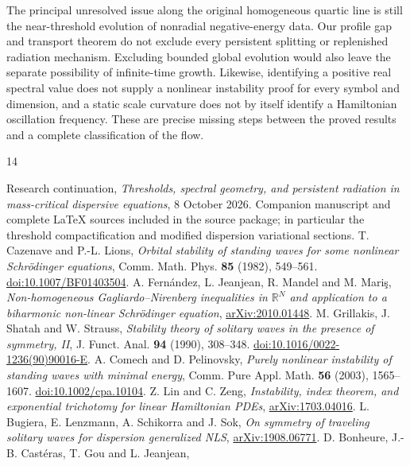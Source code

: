\documentclass[11pt,a4paper]{article}
\theoremstyle{remark}\newtheorem{remark}[theorem]{Remark}
\begin{document}
The principal unresolved issue along the original homogeneous quartic
line is still the near-threshold evolution of nonradial negative-energy
data. Our profile gap and transport theorem do not exclude every
persistent splitting or replenished radiation mechanism. Excluding
bounded global evolution would also leave the separate possibility of
infinite-time growth. Likewise, identifying a positive real spectral
value does not supply a nonlinear instability proof for every symbol
and dimension, and a static scale curvature does not by itself identify
a Hamiltonian oscillation frequency. These are precise missing steps
between the proved results and a complete classification of the flow.

\clearpage
\begin{thebibliography}{14}
\raggedright
{} Research continuation,
\emph{Thresholds, spectral geometry, and persistent radiation in
mass-critical dispersive equations}, 8 October 2026.
Companion manuscript and complete LaTeX sources included in the source
package; in particular the threshold compactification and modified
dispersion variational sections.
 T. Cazenave and P.-L. Lions,
\emph{Orbital stability of standing waves for some nonlinear Schr\"odinger equations},
Comm. Math. Phys. \textbf{85} (1982), 549--561.
\href{https://doi.org/10.1007/BF01403504}{doi:10.1007/BF01403504}.
 A. Fern\'andez, L. Jeanjean, R. Mandel and M. Mari\c{s},
\emph{Non-homogeneous Gagliardo--Nirenberg inequalities in
$\mathbb R^N$ and application to a biharmonic non-linear Schr\"odinger equation},
\href{https://arxiv.org/abs/2010.01448}{arXiv:2010.01448}.
 M. Grillakis, J. Shatah and W. Strauss,
\emph{Stability theory of solitary waves in the presence of symmetry, II},
J. Funct. Anal. \textbf{94} (1990), 308--348.
\href{https://doi.org/10.1016/0022-1236(90)90016-E}{doi:10.1016/0022-1236(90)90016-E}.
 A. Comech and D. Pelinovsky,
\emph{Purely nonlinear instability of standing waves with minimal energy},
Comm. Pure Appl. Math. \textbf{56} (2003), 1565--1607.
\href{https://doi.org/10.1002/cpa.10104}{doi:10.1002/cpa.10104}.
 Z. Lin and C. Zeng,
\emph{Instability, index theorem, and exponential trichotomy for linear
Hamiltonian PDEs},
\href{https://arxiv.org/abs/1703.04016}{arXiv:1703.04016}.
 L. Bugiera, E. Lenzmann, A. Schikorra and J. Sok,
\emph{On symmetry of traveling solitary waves for dispersion generalized NLS},
\href{https://arxiv.org/abs/1908.06771}{arXiv:1908.06771}.
 D. Bonheure, J.-B. Cast\'eras, T. Gou and L. Jeanjean,

\end{thebibliography}
\end{document}
